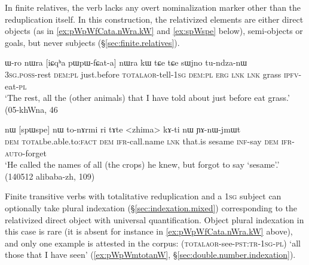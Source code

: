 In finite relatives, the verb lacks any overt nominalization marker other than the reduplication itself. In this construction, the relativized elements are either direct objects (as in \ref{ex:pWpWfCata.nWra.kW} and \ref{ex:spWspe} below), semi-objects or goals, but never subjects (§\ref{sec:finite.relatives}).

\begin{exe}
\ex \label{ex:pWpWfCata.nWra.kW}
\gll ɯ-ro nɯra [iɕqʰa pɯ\redp{}pɯ-fɕat-a] nɯra kɯ tɕe tɕe sɯjno tu-ndza-nɯ  \\
\textsc{3sg}.\textsc{poss}-rest \textsc{dem}:\textsc{pl} just.before \textsc{total}\redp{}\textsc{aor}-tell-\textsc{1sg} \textsc{dem}:\textsc{pl} \textsc{erg} \textsc{lnk}  \textsc{lnk} grass \textsc{ipfv}-eat-\textsc{pl} \\
\glt `The rest, all the (other animals) that I have told about just before eat grass.' (05-khWna, 46
\end{exe}


\begin{exe}
\ex \label{ex:spWspe}
\gll nɯ [spɯ\redp{}spe] nɯ to-nɤrmi ri tɤte <zhima> kɤ-ti nɯ ɲɤ-nɯ-jmɯt \\
\textsc{dem} \textsc{total}\redp{}be.able.to:\textsc{fact} \textsc{dem} \textsc{ifr}-call.name \textsc{lnk} that.is sesame \textsc{inf}-say \textsc{dem} \textsc{ifr}-\textsc{auto}-forget \\
\glt `He called the names of all (the crops) he knew, but forgot to say `sesame'.' (140512 alibaba-zh, 109)
\end{exe}

Finite transitive verbs with totalitative reduplication and a \textsc{1sg} subject can optionally take plural indexation (§\ref{sec:indexation.mixed}) corresponding to the relativized direct object with universal quantification. Object plural indexation in this case is rare (it is absent for instance in \ref{ex:pWpWfCata.nWra.kW} above), and only one example is attested in the corpus:  (\textsc{total}\redp{}\textsc{aor}-see-\textsc{pst}:\textsc{tr}-\textsc{1sg}-\textsc{pl}) `all those that I have seen' (\ref{ex:pWpWmtotanW}, §\ref{sec:double.number.indexation}).


